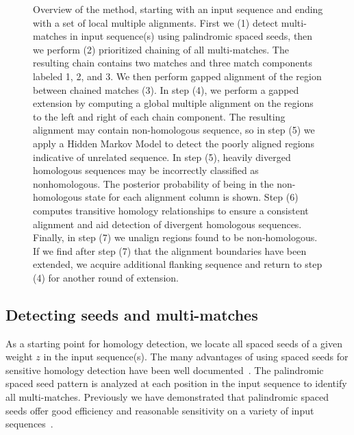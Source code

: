 \documentclass{ws-procs9x6}
\begin{document}
\begin{figure}[p]
\begin{center}
\end{center}
\caption{Overview of the method, starting with an input sequence and ending with a set of local multiple alignments. First we (1) detect multi-matches in input sequence(s) using palindromic spaced seeds, then we perform (2) prioritized chaining of all multi-matches.  The resulting chain contains two matches and three match components labeled 1, 2, and 3.  We then perform gapped alignment of the region between chained matches (3).   In step (4), we perform a gapped extension by computing a global multiple alignment on the regions to the left and right of each chain component.  The resulting alignment may contain non-homologous sequence, so in step (5) we apply a Hidden Markov Model to detect the poorly aligned regions indicative of unrelated sequence.  In step (5), heavily diverged homologous sequences may be incorrectly classified as nonhomologous. The posterior probability of being in the non-homologous state for each alignment column is shown.  Step (6) computes transitive homology relationships to ensure a consistent alignment and aid detection of divergent homologous sequences.  Finally, in step (7) we unalign regions found to be non-homologous.  If we find after step (7) that the alignment boundaries have been extended, we acquire additional flanking sequence and return to step (4) for another round of extension.}
\label{fig-main}
\end{figure}



\subsection{Detecting seeds and multi-matches}

As a starting point for homology detection, we locate all spaced seeds of a given weight $z$ in the input sequence(s). The many advantages of using spaced seeds for sensitive homology detection have been well documented~\cite{ref-spacedseeds, ref-pattern}. The palindromic spaced seed pattern is analyzed at each position in the input sequence to identify all multi-matches.  Previously we have demonstrated that palindromic spaced seeds offer good efficiency and reasonable sensitivity on a variety of input sequences~\cite{ref-procrast}.
\end{document}

